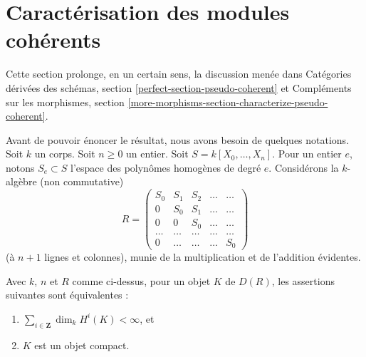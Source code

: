 \section{Caractérisation des modules cohérents}
\label{section-coherent}

\noindent
Cette section prolonge, en un certain sens, la discussion menée
dans Catégories dérivées des schémas, section \ref{perfect-section-pseudo-coherent}
et Compléments sur les morphismes, section
\ref{more-morphisms-section-characterize-pseudo-coherent}.

\medskip\noindent
Avant de pouvoir énoncer le résultat, nous avons besoin de quelques notations.
Soit $k$ un corps. Soit $n \geq 0$ un entier.
Soit $S = k[X_0, \ldots, X_n]$. Pour un entier $e$, notons
$S_e \subset S$ l'espace des polynômes homogènes de degré $e$.
Considérons la $k$-algèbre (non commutative)
$$
R =
\left(
\begin{matrix}
S_0 & S_1 & S_2 & \ldots & \ldots \\
0 & S_0 & S_1 & \ldots & \ldots\\
0 & 0 & S_0 & \ldots & \ldots \\
\ldots & \ldots & \ldots & \ldots & \ldots \\
0 & \ldots & \ldots & \ldots & S_0
\end{matrix}
\right)
$$
(à $n + 1$ lignes et colonnes), munie de la multiplication et de l'addition évidentes.

\begin{lemma}
\label{lemma-perfect-for-R}
Avec $k$, $n$ et $R$ comme ci-dessus, pour un objet $K$ de $D(R)$,
les assertions suivantes sont équivalentes :
\begin{enumerate}
\item $\sum_{i \in \mathbf{Z}} \dim_k H^i(K) < \infty$, et
\item $K$ est un objet compact.
\end{enumerate}
\end{lemma}

